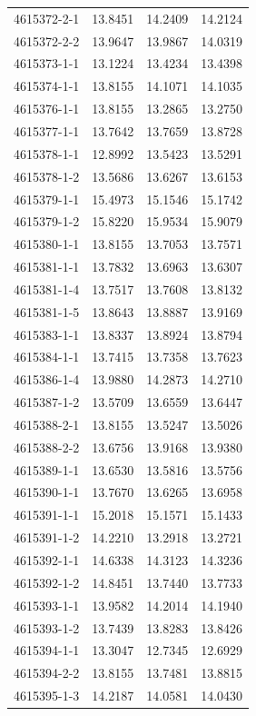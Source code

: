 \begin{longtable}{lrrr}
4615372-2-1 & 13.8451 & 14.2409 & 14.2124 \\
4615372-2-2 & 13.9647 & 13.9867 & 14.0319 \\
4615373-1-1 & 13.1224 & 13.4234 & 13.4398 \\
4615374-1-1 & 13.8155 & 14.1071 & 14.1035 \\
4615376-1-1 & 13.8155 & 13.2865 & 13.2750 \\
4615377-1-1 & 13.7642 & 13.7659 & 13.8728 \\
4615378-1-1 & 12.8992 & 13.5423 & 13.5291 \\
4615378-1-2 & 13.5686 & 13.6267 & 13.6153 \\
4615379-1-1 & 15.4973 & 15.1546 & 15.1742 \\
4615379-1-2 & 15.8220 & 15.9534 & 15.9079 \\
4615380-1-1 & 13.8155 & 13.7053 & 13.7571 \\
4615381-1-1 & 13.7832 & 13.6963 & 13.6307 \\
4615381-1-4 & 13.7517 & 13.7608 & 13.8132 \\
4615381-1-5 & 13.8643 & 13.8887 & 13.9169 \\
4615383-1-1 & 13.8337 & 13.8924 & 13.8794 \\
4615384-1-1 & 13.7415 & 13.7358 & 13.7623 \\
4615386-1-4 & 13.9880 & 14.2873 & 14.2710 \\
4615387-1-2 & 13.5709 & 13.6559 & 13.6447 \\
4615388-2-1 & 13.8155 & 13.5247 & 13.5026 \\
4615388-2-2 & 13.6756 & 13.9168 & 13.9380 \\
4615389-1-1 & 13.6530 & 13.5816 & 13.5756 \\
4615390-1-1 & 13.7670 & 13.6265 & 13.6958 \\
4615391-1-1 & 15.2018 & 15.1571 & 15.1433 \\
4615391-1-2 & 14.2210 & 13.2918 & 13.2721 \\
4615392-1-1 & 14.6338 & 14.3123 & 14.3236 \\
4615392-1-2 & 14.8451 & 13.7440 & 13.7733 \\
4615393-1-1 & 13.9582 & 14.2014 & 14.1940 \\
4615393-1-2 & 13.7439 & 13.8283 & 13.8426 \\
4615394-1-1 & 13.3047 & 12.7345 & 12.6929 \\
4615394-2-2 & 13.8155 & 13.7481 & 13.8815 \\
4615395-1-3 & 14.2187 & 14.0581 & 14.0430 \\

\end{longtable}
